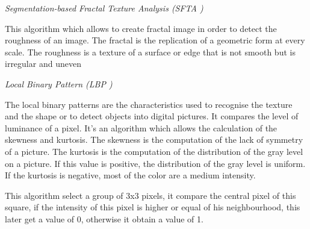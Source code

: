 \textit{Segmentation-based Fractal Texture Analysis (SFTA )}

This algorithm which allows to create fractal image in order to detect the
roughness of an image. The fractal is the replication of a geometric form at every scale.
The roughness is a texture of a surface or edge that is not smooth but is irregular and uneven
    
\textit{Local Binary Pattern (LBP )}

The local binary patterns are the characteristics used to recognise the texture and the shape or to detect
objects into digital pictures. It compares the level of luminance of a pixel.
It's an algorithm which allows the calculation of the skewness and kurtosis.
The skewness is the computation of the lack of symmetry of a picture.
The kurtosis is the computation of the distribution of the gray level on a picture. If this value is positive,
the distribution of the gray level is uniform. If the kurtosis is negative, most of the color are a
medium intensity.

This algorithm select a group of 3x3 pixels, it compare the central pixel of this square, if the intensity of this pixel is higher or equal of his neighbourhood, this later get a value of 0, otherwise it obtain a value of 1.


    
    
    